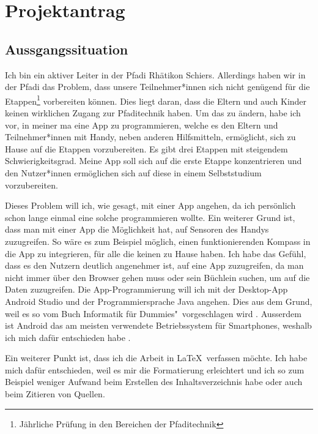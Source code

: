 \documentclass{report}
\begin{document}
\AddToShipoutPicture*{\BackgroundPic}

\maketitle
\tableofcontents
\chapter{Projektantrag}
\section{Aussgangssituation}
Ich bin ein aktiver Leiter in der Pfadi Rhätikon Schiers. Allerdings haben wir in der Pfadi das Problem, dass unsere Teilnehmer*innen sich nicht genügend für die Etappen\footnote{Jährliche Prüfung in den Bereichen der Pfaditechnik} vorbereiten können. Dies liegt daran, dass die Eltern und auch Kinder keinen wirklichen Zugang zur Pfaditechnik haben. Um das zu ändern, habe ich vor, in meiner \gls{ma} eine App zu programmieren, welche es den Eltern und Teilnehmer*innen mit Handy, neben anderen Hilfsmitteln, ermöglicht, sich zu Hause auf die Etappen vorzubereiten. Es gibt drei Etappen mit steigendem Schwierigkeitsgrad. Meine App soll sich auf die erste Etappe konzentrieren und den Nutzer*innen ermöglichen sich auf diese in einem Selbststudium vorzubereiten\cite{anforderungen}. \par
Dieses Problem will ich, wie gesagt, mit einer App angehen, da ich persönlich schon lange einmal eine solche programmieren wollte. Ein weiterer Grund ist, dass man mit einer App die Möglichkeit hat, auf Sensoren des Handys zuzugreifen. So wäre es zum Beispiel möglich, einen funktionierenden Kompass in die App zu integrieren, für alle die keinen zu Hause haben. Ich habe das Gefühl, dass es den Nutzern deutlich angenehmer ist, auf eine App zuzugreifen, da man nicht immer über den Browser gehen muss oder sein Büchlein suchen, um auf die Daten zuzugreifen. Die App-Programmierung will ich mit der Desktop-App Android Studio und der Programmiersprache Java angehen. Dies aus dem Grund, weil es so vom Buch \glqq Informatik für Dummies"\ vorgeschlagen wird \cite{dummies}. Ausserdem ist Android das am meisten verwendete Betriebssystem für Smartphones, weshalb ich mich dafür entschieden habe \cite{statistik_android}.
\par
Ein weiterer Punkt ist, dass ich die Arbeit in \LaTeX \ verfassen möchte. Ich habe mich dafür entschieden, weil es mir die Formatierung erleichtert und ich so zum Beispiel weniger Aufwand beim Erstellen des Inhaltsverzeichnis habe oder auch beim Zitieren von Quellen.
\end{document}
